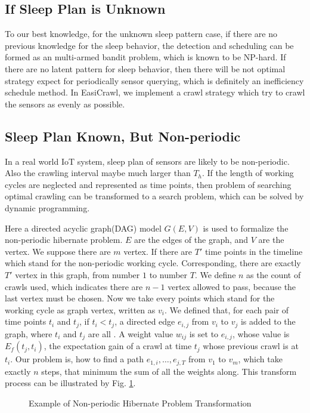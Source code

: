 \documentclass[conference]{IEEEtran}
\begin{document}
\subsection{If Sleep Plan is Unknown}
To our best knowledge, for the unknown sleep pattern case, if there are no previous knowledge for the sleep behavior, the detection and scheduling can be formed as an multi-armed bandit problem, which is known to be NP-hard. If there are no latent pattern for sleep behavior, then there will be not optimal strategy expect for periodically sensor querying, which is definitely an inefficiency schedule method. In EasiCrawl, we implement a crawl strategy which try to crawl the sensors as evenly as possible.


\subsection{Sleep Plan Known, But Non-periodic}
In a real world IoT system, sleep plan of sensors are likely to be non-periodic. Also the crawling interval maybe much larger than $T_h$. 
If the length of working cycles are neglected and represented as time points, then problem of searching optimal crawling can be transformed to a search problem, which can be solved by dynamic programming.


Here a directed acyclic graph(DAG) model $G(E,V)$ is used to formalize the non-periodic hibernate problem.
$E$ are the edges of the graph, and $V$ are the vertex. We suppose there are $m$ vertex. 
If there are $T'$ time points in the timeline which stand for the non-periodic working cycle. Corresponding, there are exactly $T'$ vertex in this graph, from number $1$ to number $T$. 
We define $n$ as the count of crawls used, which indicates there are $n-1$ vertex allowed to pass, because the last vertex must be chosen. 
Now we take every points which stand for the working cycle as graph vertex, written as $v_i$. We defined that, for each pair of time points $t_i$ and $t_j$, if $t_i<t_j$, a directed edge $e_{i,j}$ from $v_i$ to $v_j$ is added to the graph, where $t_i$ and $t_j$ are all . A weight value $w_{ij}$ is set to $e_{i,j}$, whose value is $E_f(t_j, t_i)$, the expectation gain of a crawl at time $t_j$ whose previous crawl is at $t_i$.
Our problem is, how to find a path $e_{1,i},\ldots,e_{j,T}$ from $v_1$ to $v_m$, which take exactly $n$ steps, that minimum the sum of all the weights along. This transform process can be illustrated by Fig. \ref{fig:problemtrans}.

\begin{figure}
	\centering
	
	\captionsetup{justification=centering}
	\caption{Example of Non-periodic Hibernate Problem Transformation}
	\label{fig:problemtrans}
\end{figure}
\end{document}
